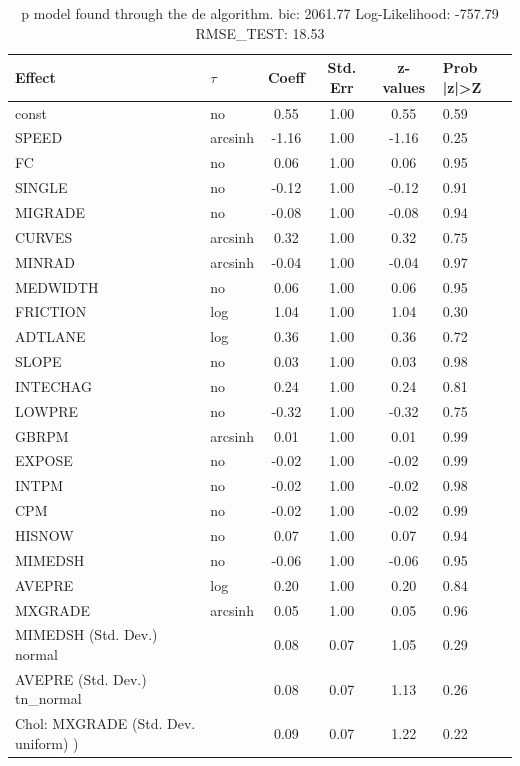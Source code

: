 \begin{table}
	\caption{p model found through the de algorithm. bic: 2061.77 Log-Likelihood: -757.79 RMSE_TEST: 18.53}
	\begin{center}
		\begin{tabular}{|l|l|c|c|c|l|}
			\hline
			Effect & $\tau$ & Coeff & Std. Err & z-values & Prob |z|>Z \\
			\hline
			const & no & 0.55 & 1.00 & 0.55 & 0.59 \\
			\hline
			SPEED & arcsinh & -1.16 & 1.00 & -1.16 & 0.25 \\
			\hline
			FC & no & 0.06 & 1.00 & 0.06 & 0.95 \\
			\hline
			SINGLE & no & -0.12 & 1.00 & -0.12 & 0.91 \\
			\hline
			MIGRADE & no & -0.08 & 1.00 & -0.08 & 0.94 \\
			\hline
			CURVES & arcsinh & 0.32 & 1.00 & 0.32 & 0.75 \\
			\hline
			MINRAD & arcsinh & -0.04 & 1.00 & -0.04 & 0.97 \\
			\hline
			MEDWIDTH & no & 0.06 & 1.00 & 0.06 & 0.95 \\
			\hline
			FRICTION & log & 1.04 & 1.00 & 1.04 & 0.30 \\
			\hline
			ADTLANE & log & 0.36 & 1.00 & 0.36 & 0.72 \\
			\hline
			SLOPE & no & 0.03 & 1.00 & 0.03 & 0.98 \\
			\hline
			INTECHAG & no & 0.24 & 1.00 & 0.24 & 0.81 \\
			\hline
			LOWPRE & no & -0.32 & 1.00 & -0.32 & 0.75 \\
			\hline
			GBRPM & arcsinh & 0.01 & 1.00 & 0.01 & 0.99 \\
			\hline
			EXPOSE & no & -0.02 & 1.00 & -0.02 & 0.99 \\
			\hline
			INTPM & no & -0.02 & 1.00 & -0.02 & 0.98 \\
			\hline
			CPM & no & -0.02 & 1.00 & -0.02 & 0.99 \\
			\hline
			HISNOW & no & 0.07 & 1.00 & 0.07 & 0.94 \\
			\hline
			MIMEDSH & no & -0.06 & 1.00 & -0.06 & 0.95 \\
			\hline
			AVEPRE & log & 0.20 & 1.00 & 0.20 & 0.84 \\
			\hline
			MXGRADE & arcsinh & 0.05 & 1.00 & 0.05 & 0.96 \\
			\hline
			MIMEDSH (Std. Dev.) normal &  & 0.08 & 0.07 & 1.05 & 0.29 \\
			\hline
			AVEPRE (Std. Dev.) tn_normal &  & 0.08 & 0.07 & 1.13 & 0.26 \\
			\hline
			 Chol: MXGRADE (Std. Dev. uniform) ) &  & 0.09 & 0.07 & 1.22 & 0.22 \\
			\hline
		\end{tabular}
	\end{center}
\end{table}